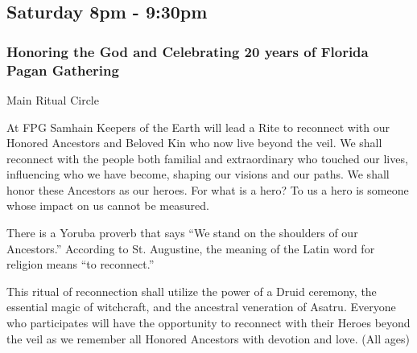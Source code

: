 \subsection{Saturday 8pm - 9:30pm}

\subsubsection{Honoring the God and Celebrating 20 years of Florida Pagan Gathering}
\label{Sat-RITUAL}
{\small  Main Ritual Circle}

 At FPG Samhain Keepers of the Earth will lead a Rite to reconnect with our Honored Ancestors and Beloved Kin who now live beyond the veil. We shall reconnect with the people both familial and extraordinary who touched our lives, influencing who we have become, shaping our visions and our paths. We shall honor these Ancestors as our heroes. For what is a hero? To us a hero is someone whose impact on us cannot be measured.
 
There is a Yoruba proverb that says  ``We stand on the shoulders of our Ancestors.''  According to St. Augustine, the meaning of the Latin word for religion means  ``to reconnect.'' 
 
This ritual of reconnection shall utilize the power of a Druid ceremony, the essential magic of witchcraft, and the ancestral veneration of Asatru. Everyone who participates will have the opportunity to reconnect with their Heroes beyond the veil as we remember all Honored Ancestors with devotion and love. {\small (All ages)}